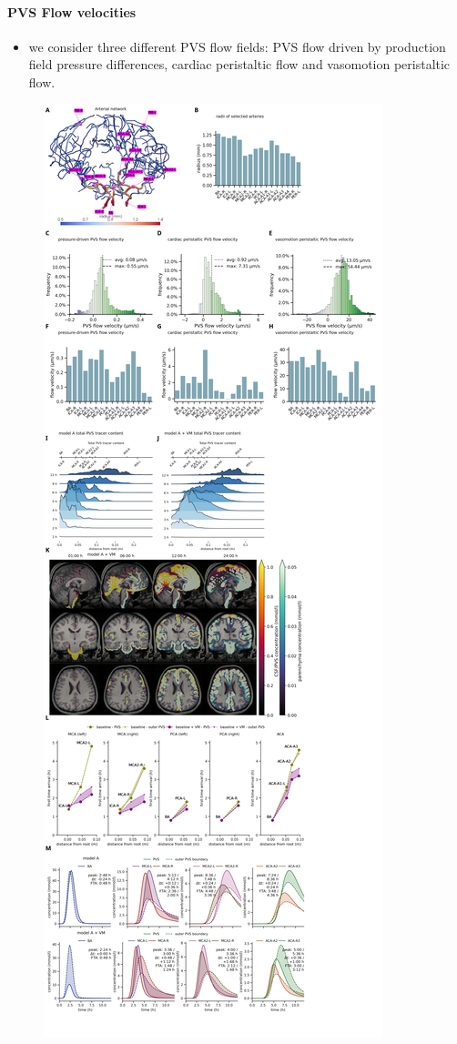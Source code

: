 \documentclass[fleqn,10pt]{wlscirep}
\begin{document}
\paragraph{PVS Flow velocities}
\begin{itemize}
    \item we consider three different PVS flow fields: PVS flow driven by production field pressure differences, cardiac peristaltic flow and vasomotion peristaltic flow. 
\end{itemize}


\begin{figure}
    \centering
    \includegraphics[height=\textheight]{figures/figure3.png}

\end{figure}
\end{document}
